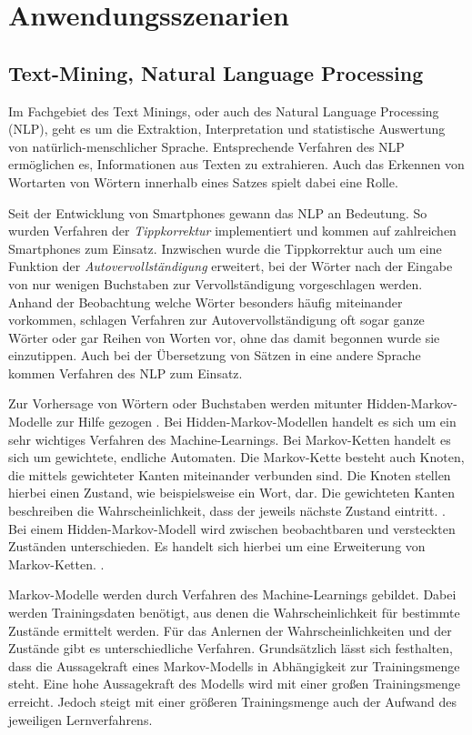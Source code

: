 \chapter{Anwendungsszenarien}
\section{Text-Mining, Natural Language Processing}
Im Fachgebiet des Text Minings, oder auch des Natural Language Processing (NLP), geht es um die Extraktion, Interpretation und statistische Auswertung von natürlich-menschlicher Sprache. Entsprechende Verfahren des NLP ermöglichen es, Informationen aus Texten zu extrahieren. Auch das Erkennen von Wortarten von Wörtern innerhalb eines Satzes spielt dabei eine Rolle.

Seit der Entwicklung von Smartphones gewann das NLP an Bedeutung. So wurden Verfahren der \emph{Tippkorrektur} implementiert und kommen auf zahlreichen Smartphones zum Einsatz. Inzwischen wurde die Tippkorrektur auch um eine Funktion der \emph{Autovervollständigung} erweitert, bei der Wörter nach der Eingabe von nur wenigen Buchstaben zur Vervollständigung vorgeschlagen werden. Anhand der Beobachtung welche Wörter besonders häufig miteinander vorkommen, schlagen Verfahren zur Autovervollständigung oft sogar ganze Wörter oder gar Reihen von Worten vor, ohne das damit begonnen wurde sie einzutippen. Auch bei der Übersetzung von Sätzen in eine andere Sprache kommen Verfahren des NLP zum Einsatz.

Zur Vorhersage von Wörtern oder Buchstaben werden mitunter Hidden-Markov-Modelle zur Hilfe gezogen \cite[p.~207]{jurafsky01}. Bei Hidden-Markov-Modellen handelt es sich um ein sehr wichtiges Verfahren des Machine-Learnings. Bei Markov-Ketten handelt es sich um gewichtete, endliche Automaten. Die Markov-Kette besteht auch Knoten, die mittels gewichteter Kanten miteinander verbunden sind. Die Knoten stellen hierbei einen Zustand, wie beispielsweise ein Wort, dar. Die gewichteten Kanten beschreiben die Wahrscheinlichkeit, dass der jeweils nächste Zustand eintritt. \cite[p.~208 ff.]{jurafsky01}\cite[p.~318 ff.]{manning01}. Bei einem Hidden-Markov-Modell wird zwischen beobachtbaren und versteckten Zuständen unterschieden. Es handelt sich hierbei um eine Erweiterung von Markov-Ketten. \cite[p.~211 ff.]{jurafsky01}.

Markov-Modelle werden durch Verfahren des Machine-Learnings gebildet. Dabei werden Trainingsdaten benötigt, aus denen die Wahrscheinlichkeit für bestimmte Zustände ermittelt werden. Für das Anlernen der Wahrscheinlichkeiten und der Zustände gibt es unterschiedliche Verfahren. \cite[p.~213 ff.]{jurafsky01}\cite[p.~326 ff.]{manning01} Grundsätzlich lässt sich festhalten, dass die Aussagekraft eines Markov-Modells in Abhängigkeit zur Trainingsmenge steht. Eine hohe Aussagekraft des Modells wird mit einer großen Trainingsmenge erreicht. Jedoch steigt mit einer größeren Trainingsmenge auch der Aufwand des jeweiligen Lernverfahrens.

